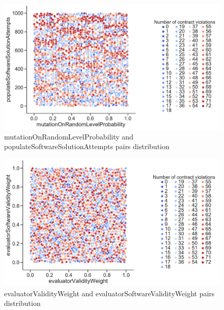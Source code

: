 \begin{figure}
	\centering
	\includegraphics[width=\textwidth]{images/PairsDistr/mutationOnRandomLevelProbability_populateSoftwareSolutionAttempts.pdf}
	\caption[mutationOnRandomLevelProbability and populateSoftwareSolutionAttempts pairs distribution]{mutationOnRandomLevelProbability and populateSoftwareSolutionAttempts pairs distribution} 
	\label{fig:mutationOnRandomLevelProbability_populateSoftwareSolutionAttempts_pair}
\end{figure}
\clearpage
\begin{figure}
	\centering
	\includegraphics[width=\textwidth]{images/PairsDistr/evaluatorValidityWeight_evaluatorSoftwareValidityWeight.pdf}
	\caption[evaluatorValidityWeight and evaluatorSoftwareValidityWeight pairs distribution]{evaluatorValidityWeight and evaluatorSoftwareValidityWeight pairs distribution}
	\label{fig:evaluatorValidityWeight_evaluatorSoftwareValidityWeight_pair}
\end{figure}
\clearpage
